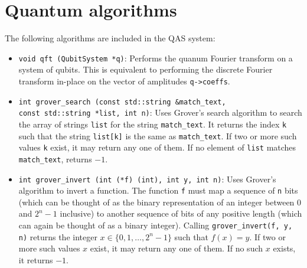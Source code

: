 \documentclass{article}
\begin{document}
\section{Quantum algorithms} 

The following algorithms are included in the QAS system: 
\begin{itemize} 
\item \verb~void qft (QubitSystem *q)~: Performs the quanum Fourier transform on a system of qubits. This is equivalent to performing the discrete Fourier transform in-place on the vector of amplitudes \verb~q->coeffs~. 

\item \verb~int grover_search (const std::string &match_text,~ \\
\verb~const std::string *list, int n)~: Uses Grover's search algorithm to search the array of strings \verb~list~ for the string \verb~match_text~. It returns the index \verb~k~ such that the string \verb~list[k]~ is the same as \verb~match_text~. If two or more such values \verb~k~ exist, it may return any one of them. If no element of \verb~list~ matches \verb~match_text~, returns $-1$. 

\item \verb~int grover_invert (int (*f) (int), int y, int n)~: Uses Grover's algorithm to invert a function. The function \verb~f~ must map a sequence of \verb~n~ bits (which can be thought of as the binary representation of an integer between 0 and $2^n - 1$ inclusive) to another sequence of bits of any positive length (which can again be thought of as a binary integer). Calling \verb~grover_invert(f, y, n)~ returns the integer $x \in \{0, 1, \dots, 2^n-1\}$ such that $f(x) = y$. If two or more such values $x$ exist, it may return any one of them. If no such $x$ exists, it returns $-1$. 

\end{itemize} 
\end{document}
